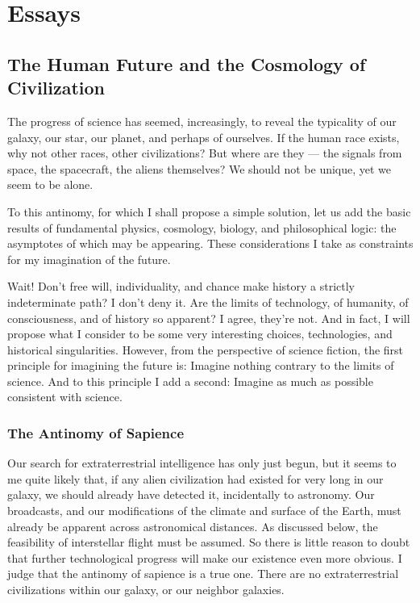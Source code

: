 \documentclass[english,11pt,letterpaper,onecolumn]{scrbook}
\begin{document}
\part{Essays}

\chapter{The Human Future and the Cosmology of Civilization}

The progress of science has seemed, increasingly, to reveal the typicality of our galaxy, our star, our planet, and perhaps of ourselves.  If the human race exists, why not other races, other civilizations?  But where are they --- the signals from space, the spacecraft, the aliens themselves?  We should not be unique, yet we seem to be alone.

To this antinomy, for which I shall propose a simple solution, let us add the basic results of fundamental physics, cosmology, biology, and philosophical logic: the asymptotes of which may be appearing.  These considerations I take as constraints for my imagination of the future.  

Wait!  Don't free will, individuality, and chance make history a strictly indeterminate path?  I don't deny it.  Are the limits of technology, of humanity, of consciousness, and of history so apparent?  I agree, they're not.  And in fact, I will propose what I consider to be some very interesting choices, technologies, and historical singularities.  However, from the perspective of science fiction, the first principle for imagining the future is:   Imagine nothing contrary to the limits of science.  And to this principle I add a second:  Imagine as much as possible consistent with science.

\section{The Antinomy of Sapience}

Our search for extraterrestrial intelligence has only just begun, but it seems to me quite likely that, if any alien civilization had existed for very long in our galaxy, we should already have detected it, incidentally to astronomy.  Our broadcasts, and our modifications of the climate and surface of the Earth, must already be apparent across astronomical distances.  As discussed below, the feasibility of interstellar flight must be assumed.  So there is little reason to doubt that further technological progress will make our existence even more obvious.  I judge that the antinomy of sapience is a true one.  There are no extraterrestrial civilizations within our galaxy, or our neighbor galaxies.  
\end{document}
